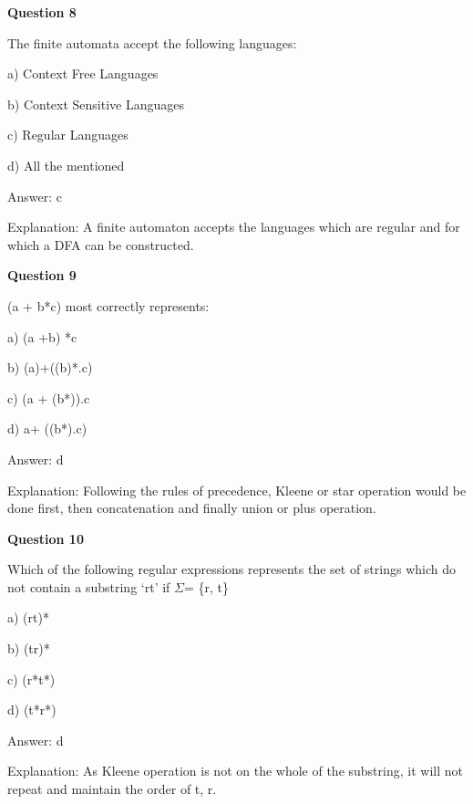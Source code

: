 \documentclass{article}
\begin{document}
\begin{mdframed}[linewidth=1pt, roundcorner=5pt, linecolor=gray!30, backgroundcolor=gray!5]
\textbf{Question 8} 

The finite automata accept the following languages:

a) Context Free Languages

b) Context Sensitive Languages

c) Regular Languages

d) All the mentioned
\vspace{5pt} \par
\begin{tcolorbox}[colback=green!5, colframe=green!40!black, title=Solution]
Answer: c

Explanation: A finite automaton accepts the languages which are regular and for which a DFA can be constructed.
\end{tcolorbox}
\end{mdframed}

\begin{mdframed}[linewidth=1pt, roundcorner=5pt, linecolor=gray!30, backgroundcolor=gray!5]
\textbf{Question 9} 

(a + b*c) most correctly represents:

a) (a +b) *c

b) (a)+((b)*.c)

c) (a + (b*)).c

d) a+ ((b*).c)
\vspace{5pt} \par
\begin{tcolorbox}[colback=green!5, colframe=green!40!black, title=Solution]
Answer: d

Explanation: Following the rules of precedence, Kleene or star operation would be done first, then concatenation and finally union or plus operation.
\end{tcolorbox}
\end{mdframed}
\newpage

\begin{mdframed}[linewidth=1pt, roundcorner=5pt, linecolor=gray!30, backgroundcolor=gray!5]
\textbf{Question 10} 

Which of the following regular expressions represents the set of strings which do not contain a substring ‘rt' if $\Sigma$= \{r, t\}

a) (rt)*

b) (tr)*

c) (r*t*)

d) (t*r*)
\vspace{5pt} \par
\begin{tcolorbox}[colback=green!5, colframe=green!40!black, title=Solution]
Answer: d

Explanation: As Kleene operation is not on the whole of the substring, it will not repeat and maintain the order of t, r.
\end{tcolorbox}
\end{mdframed}
\end{document}
